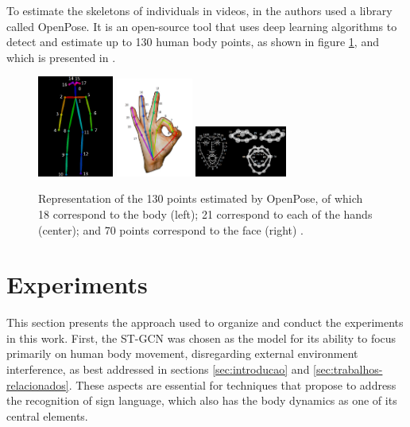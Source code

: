 To estimate the skeletons of individuals in videos, in \cite{st-gcn-2018} the authors used a library called OpenPose. It is an open-source tool that uses deep learning algorithms to detect and estimate up to 130 human body points, as shown in figure \ref{fig:keypoints-openpose}, and which is presented in \cite{cao-realtime-2017, simon-hand-2017, wei-cpm-2016}.

\begin{figure}[ht]
    \centering
    \includegraphics[width=2.5cm]{images/keypoints_pose_COCO_18}
    \includegraphics[width=2.5cm]{images/keypoints_hand}
    \includegraphics[width=3cm]{images/keypoints_face}
    \caption{Representation of the 130 points estimated by OpenPose, of which 18 correspond to the body (left); 21 correspond to each of the hands (center); and 70 points correspond to the face (right) \cite{openpose-output-2018}.}
    \label{fig:keypoints-openpose}
\end{figure}


\section{Experiments} 
\label{sec:experimentos}

This section presents the approach used to organize and conduct the experiments in this work. First, the ST-GCN was chosen as the model for its ability to focus primarily on human body movement, disregarding external environment interference, as best addressed in sections \ref{sec:introducao} and \ref{sec:trabalhos-relacionados}. These aspects are essential for techniques that propose to address the recognition of sign language, which also has the body dynamics as one of its central elements.

